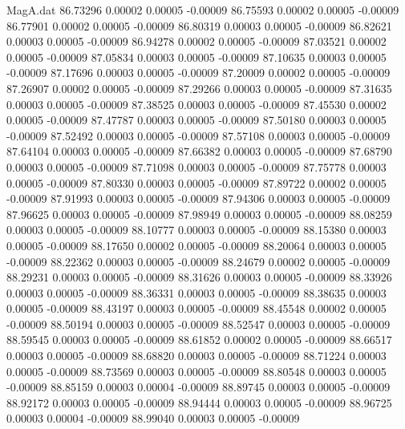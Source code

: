 \begin{filecontents}{MagA.dat}
  86.73296    0.00002    0.00005   -0.00009
  86.75593    0.00002    0.00005   -0.00009
  86.77901    0.00002    0.00005   -0.00009
  86.80319    0.00003    0.00005   -0.00009
  86.82621    0.00003    0.00005   -0.00009
  86.94278    0.00002    0.00005   -0.00009
  87.03521    0.00002    0.00005   -0.00009
  87.05834    0.00003    0.00005   -0.00009
  87.10635    0.00003    0.00005   -0.00009
  87.17696    0.00003    0.00005   -0.00009
  87.20009    0.00002    0.00005   -0.00009
  87.26907    0.00002    0.00005   -0.00009
  87.29266    0.00003    0.00005   -0.00009
  87.31635    0.00003    0.00005   -0.00009
  87.38525    0.00003    0.00005   -0.00009
  87.45530    0.00002    0.00005   -0.00009
  87.47787    0.00003    0.00005   -0.00009
  87.50180    0.00003    0.00005   -0.00009
  87.52492    0.00003    0.00005   -0.00009
  87.57108    0.00003    0.00005   -0.00009
  87.64104    0.00003    0.00005   -0.00009
  87.66382    0.00003    0.00005   -0.00009
  87.68790    0.00003    0.00005   -0.00009
  87.71098    0.00003    0.00005   -0.00009
  87.75778    0.00003    0.00005   -0.00009
  87.80330    0.00003    0.00005   -0.00009
  87.89722    0.00002    0.00005   -0.00009
  87.91993    0.00003    0.00005   -0.00009
  87.94306    0.00003    0.00005   -0.00009
  87.96625    0.00003    0.00005   -0.00009
  87.98949    0.00003    0.00005   -0.00009
  88.08259    0.00003    0.00005   -0.00009
  88.10777    0.00003    0.00005   -0.00009
  88.15380    0.00003    0.00005   -0.00009
  88.17650    0.00002    0.00005   -0.00009
  88.20064    0.00003    0.00005   -0.00009
  88.22362    0.00003    0.00005   -0.00009
  88.24679    0.00002    0.00005   -0.00009
  88.29231    0.00003    0.00005   -0.00009
  88.31626    0.00003    0.00005   -0.00009
  88.33926    0.00003    0.00005   -0.00009
  88.36331    0.00003    0.00005   -0.00009
  88.38635    0.00003    0.00005   -0.00009
  88.43197    0.00003    0.00005   -0.00009
  88.45548    0.00002    0.00005   -0.00009
  88.50194    0.00003    0.00005   -0.00009
  88.52547    0.00003    0.00005   -0.00009
  88.59545    0.00003    0.00005   -0.00009
  88.61852    0.00002    0.00005   -0.00009
  88.66517    0.00003    0.00005   -0.00009
  88.68820    0.00003    0.00005   -0.00009
  88.71224    0.00003    0.00005   -0.00009
  88.73569    0.00003    0.00005   -0.00009
  88.80548    0.00003    0.00005   -0.00009
  88.85159    0.00003    0.00004   -0.00009
  88.89745    0.00003    0.00005   -0.00009
  88.92172    0.00003    0.00005   -0.00009
  88.94444    0.00003    0.00005   -0.00009
  88.96725    0.00003    0.00004   -0.00009
  88.99040    0.00003    0.00005   -0.00009

\end{filecontents}
